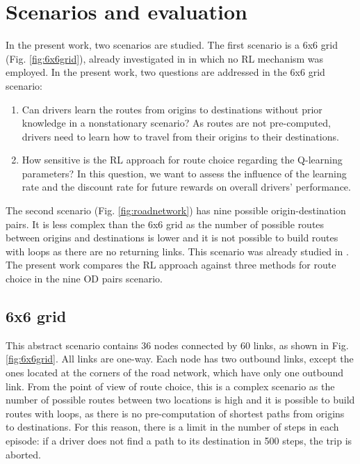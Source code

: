 \documentclass{RITA}
\begin{document}
\section{Scenarios and evaluation}
\label{sec:scenario}
In the present work, two scenarios are studied. The first scenario is a 6x6 grid (Fig. \ref{fig:6x6grid}), already investigated in \cite{Bazzan+2007alag,Bazzan+2008alamas} in which no RL mechanism was employed. In the present work, two questions are addressed in the 6x6 grid scenario:

\begin{enumerate}
  \item Can drivers learn the routes from origins to destinations without prior knowledge in a nonstationary scenario? As routes are not pre-computed, drivers need to learn how to travel from their origins to their destinations.
  \item How sensitive is the RL approach for route choice regarding the Q-learning parameters? In this question, we want to assess the influence of the learning rate and the discount rate for future rewards on overall drivers' performance.
\end{enumerate}

The second scenario (Fig. \ref{fig:roadnetwork}) has nine possible origin-destination pairs. It is less complex than the 6x6 grid as the number of possible routes between origins and destinations is lower and it is not possible to build routes with loops as there are no returning links. This scenario was already studied in \cite{Tavares&Bazzan2012,Galib&Moser2011}. The present work compares the RL approach against three methods for route choice in the nine OD pairs scenario.

\subsection{6x6 grid}
\label{sec:gridDescription}
This abstract scenario contains 36 nodes connected by 60 links, as shown in Fig. \ref{fig:6x6grid}. All links are one-way. Each node has two outbound links, except the ones located at the corners of the road network, which have only one outbound link. From the point of view of route choice, this is a complex scenario as the number of possible routes between two locations is high and it is possible to build routes with loops, as there is no pre-computation of shortest paths from origins to destinations. For this reason, there is a limit in the number of steps in each episode: if a driver does not find a path to its destination in 500 steps, the trip is aborted.
\end{document}
